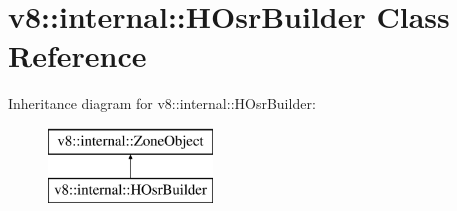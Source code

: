 \hypertarget{classv8_1_1internal_1_1_h_osr_builder}{}\section{v8\+:\+:internal\+:\+:H\+Osr\+Builder Class Reference}
\label{classv8_1_1internal_1_1_h_osr_builder}
Inheritance diagram for v8\+:\+:internal\+:\+:H\+Osr\+Builder\+:\begin{figure}[H]
\begin{center}
\leavevmode
\includegraphics[height=2.000000cm]{classv8_1_1internal_1_1_h_osr_builder}
\end{center}
\end{figure}
